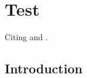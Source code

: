 \documentclass[onecolumn, letter paper]{report}
\begin{document}
\maketitle

\chapter{Test}

Citing \cite{Tedrake} and  \cite{di2020software}.

\section{Introduction}

\printbibliography
\end{document}

